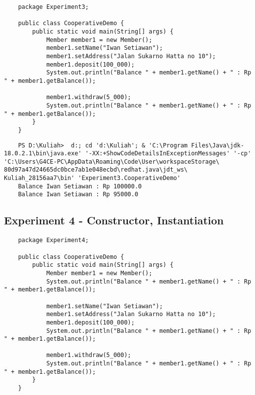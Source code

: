 \documentclass[12pt,titlepage]{article}
\begin{document}
\begin{verbatim}
    package Experiment3;

    public class CooperativeDemo {
        public static void main(String[] args) {
            Member member1 = new Member();
            member1.setName("Iwan Setiawan");
            member1.setAddress("Jalan Sukarno Hatta no 10");
            member1.deposit(100_000);
            System.out.println("Balance " + member1.getName() + " : Rp " + member1.getBalance());
            
            member1.withdraw(5_000);
            System.out.println("Balance " + member1.getName() + " : Rp " + member1.getBalance());
        }
    }

\end{verbatim}

\begin{verbatim}
    PS D:\Kuliah>  d:; cd 'd:\Kuliah'; & 'C:\Program Files\Java\jdk-18.0.2.1\bin\java.exe' '-XX:+ShowCodeDetailsInExceptionMessages' '-cp' 'C:\Users\G4CE-PC\AppData\Roaming\Code\User\workspaceStorage\ 80d97a47d24665dc0bce7ab1e048ecbd\redhat.java\jdt_ws\ Kuliah_28156aa7\bin' 'Experiment3.CooperativeDemo'
    Balance Iwan Setiawan : Rp 100000.0
    Balance Iwan Setiawan : Rp 95000.0
\end{verbatim}

\newpage

\subsection{Experiment 4 - Constructor, Instantiation}

\begin{verbatim}
    package Experiment4;

    public class CooperativeDemo {
        public static void main(String[] args) {
            Member member1 = new Member();
            System.out.println("Balance " + member1.getName() + " : Rp " + member1.getBalance());
            
            member1.setName("Iwan Setiawan");
            member1.setAddress("Jalan Sukarno Hatta no 10");
            member1.deposit(100_000);
            System.out.println("Balance " + member1.getName() + " : Rp " + member1.getBalance());
            
            member1.withdraw(5_000);
            System.out.println("Balance " + member1.getName() + " : Rp " + member1.getBalance());
        }
    }

\end{verbatim}
\end{document}
